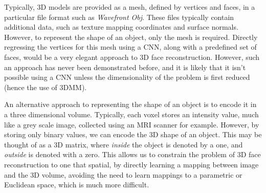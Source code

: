 Typically, 3D models are provided as a mesh, defined by vertices and
faces, in a particular file format such as \textit{Wavefront
  Obj}. These files typically contain additional data, such as texture
mapping coordinates and surface normals. However, to represent the
shape of an object, only the mesh is required. Directly regressing the
vertices for this mesh using a CNN, along with a predefined set of
faces, would be a very elegant approach to 3D face
reconstruction. However, such an approach has never been demonstrated
before, and it is likely that it isn't possible using a CNN unless the
dimensionality of the problem is first reduced (hence the use of 3DMM).

An alternative approach to representing the shape of an object is to
encode it in a three dimensional volume. Typically, each voxel stores
an intensity value, much like a grey scale image, collected using an
MRI scanner for example. However, by storing only binary values, we
can encode the 3D shape of an object. This may be thought of as a 3D
matrix, where \textit{inside} the object is denoted by a one, and
\textit{outside} is denoted with a zero. This allows us to constrain
the problem of 3D face reconstruction to one that spatial, by directly
learning a mapping between image and the 3D volume, avoiding the need
to learn mappings to a parametric or Euclidean space, which is much
more difficult.

